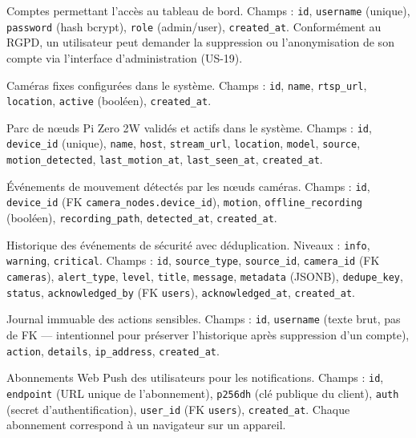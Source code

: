 \documentclass[12pt,a4paper]{article}
\begin{document}
\begin{description}[leftmargin=2.5cm, style=nextline]
    \item[\texttt{users}]
    Comptes permettant l'accès au tableau de bord. Champs : \texttt{id}, \texttt{username} (unique), \texttt{password} (hash bcrypt), \texttt{role} (admin/user), \texttt{created\_at}. Conformément au RGPD, un utilisateur peut demander la suppression ou l'anonymisation de son compte via l'interface d'administration (US-19).

    \item[\texttt{cameras}]
    Caméras fixes configurées dans le système. Champs : \texttt{id}, \texttt{name}, \texttt{rtsp\_url}, \texttt{location}, \texttt{active} (booléen), \texttt{created\_at}.

    \item[\texttt{camera\_nodes}]
    Parc de nœuds Pi Zero 2W validés et actifs dans le système. Champs : \texttt{id}, \texttt{device\_id} (unique), \texttt{name}, \texttt{host}, \texttt{stream\_url}, \texttt{location}, \texttt{model}, \texttt{source}, \texttt{motion\_detected}, \texttt{last\_motion\_at}, \texttt{last\_seen\_at}, \texttt{created\_at}.

    \item[\texttt{camera\_node\_motion\_events}]
    Événements de mouvement détectés par les nœuds caméras. Champs : \texttt{id}, \texttt{device\_id} (FK \texttt{camera\_nodes.device\_id}), \texttt{motion}, \texttt{offline\_recording} (booléen), \texttt{recording\_path}, \texttt{detected\_at}, \texttt{created\_at}.

    \item[\texttt{alerts}]
    Historique des événements de sécurité avec déduplication. Niveaux : \texttt{info}, \texttt{warning}, \texttt{critical}. Champs : \texttt{id}, \texttt{source\_type}, \texttt{source\_id}, \texttt{camera\_id} (FK \texttt{cameras}), \texttt{alert\_type}, \texttt{level}, \texttt{title}, \texttt{message}, \texttt{metadata} (JSONB), \texttt{dedupe\_key}, \texttt{status}, \texttt{acknowledged\_by} (FK \texttt{users}), \texttt{acknowledged\_at}, \texttt{created\_at}.

    \item[\texttt{audit\_logs}]
    Journal immuable des actions sensibles. Champs : \texttt{id}, \texttt{username} (texte brut, pas de FK — intentionnel pour préserver l'historique après suppression d'un compte), \texttt{action}, \texttt{details}, \texttt{ip\_address}, \texttt{created\_at}.

    \item[\texttt{push\_subscriptions}]
    Abonnements Web Push des utilisateurs pour les notifications. Champs : \texttt{id}, \texttt{endpoint} (URL unique de l'abonnement), \texttt{p256dh} (clé publique du client), \texttt{auth} (secret d'authentification), \texttt{user\_id} (FK \texttt{users}), \texttt{created\_at}. Chaque abonnement correspond à un navigateur sur un appareil.


\end{description}
\end{document}

